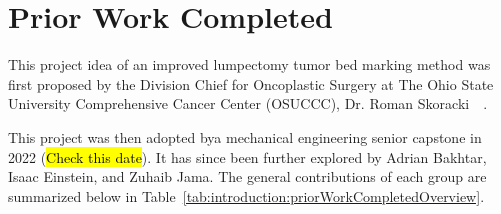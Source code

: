 \section{Prior Work Completed\label{introduction:priorWork}}

This project idea of an improved lumpectomy tumor bed marking method was first proposed by the Division Chief for Oncoplastic Surgery at The Ohio State University Comprehensive Cancer Center (OSUCCC), Dr. Roman Skoracki~\cite{RefWorks:RefID:372-krakovskytumor}~\cite{RefWorks:RefID:371-bakhtardesign}.

This project was then adopted bya mechanical engineering senior capstone in 2022 (\hl{Check this date}). It has since been further explored by Adrian Bakhtar, Isaac Einstein, and Zuhaib Jama. The general contributions of each group are summarized below in Table~\ref{tab:introduction:priorWorkCompletedOverview}.

